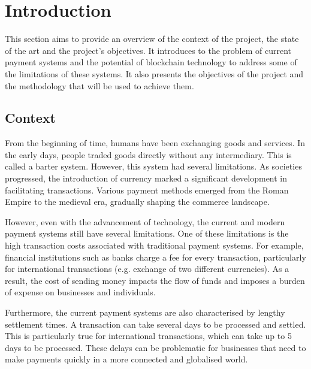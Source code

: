 \chapter{Introduction}
\label{ch:introduction}

This section aims to provide an overview of the context of the project, the state of the art and the project's objectives. It introduces to the
problem of current payment systems and the potential of blockchain technology to address some of the limitations of these systems. It also presents the
objectives of the project and the methodology that will be used to achieve them.

\minitoc



\section{Context}
\label{sec:ch1_context}


From the beginning of time, humans have been exchanging goods and services. In the early days, people traded goods
directly without any intermediary. This is called a barter system. However, this system had several limitations. As societies progressed,
the introduction of currency marked a significant development in facilitating transactions. Various payment methods emerged from the Roman Empire to the medieval era, gradually shaping the commerce landscape.


However, even with the advancement of technology, the current and modern payment systems still have several limitations. One
of these limitations is the high transaction costs associated with traditional payment systems. For example, financial institutions
such as banks charge a fee for every transaction, particularly for international transactions (e.g. exchange of two different currencies). As a result, the cost of sending money impacts the
flow of funds and imposes a burden of expense on businesses and individuals.


Furthermore, the current payment systems are also characterised by lengthy settlement times. A transaction can take several days
to be processed and settled. This is particularly true for international transactions, which can take up to 5 days to be processed. These delays can be
problematic for businesses that need to make payments quickly in a more connected and globalised world.


